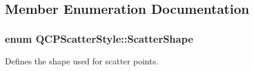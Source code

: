 \subsection{Member Enumeration Documentation}
\hypertarget{class_q_c_p_scatter_style_adb31525af6b680e6f1b7472e43859349}{}
\subsubsection[{Scatter\+Shape}]{\setlength{\rightskip}{0pt plus 5cm}enum {\bf Q\+C\+P\+Scatter\+Style\+::\+Scatter\+Shape}}\label{class_q_c_p_scatter_style_adb31525af6b680e6f1b7472e43859349}
Defines the shape used for scatter points.

